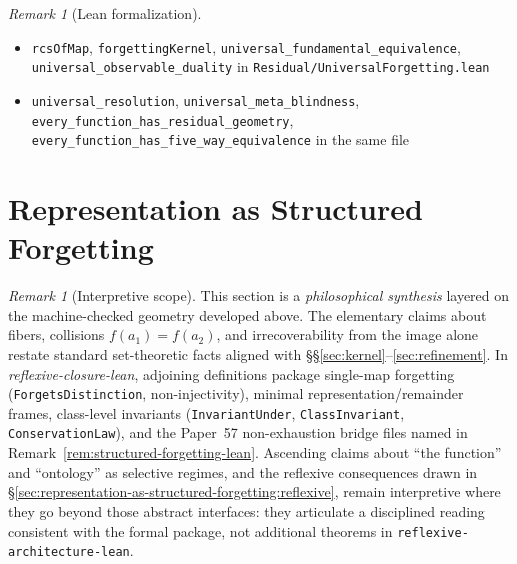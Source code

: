 \documentclass[11pt,a4paper]{article}
\theoremstyle{plain}
\theoremstyle{definition}
\theoremstyle{remark}
\newtheorem{remark}[theorem]{Remark}
\begin{document}
\begin{remark}[Lean formalization]
\leavevmode\par\begin{itemize}[nosep,leftmargin=*,before=\raggedright]
\item \texttt{rcsOfMap}, \texttt{forgettingKernel}, \texttt{universal\_fundamental\_\allowbreak{}equivalence}, \texttt{universal\_observable\_\allowbreak{}duality} in \texttt{Residual/\allowbreak{}UniversalForgetting.lean}
\item \texttt{universal\_resolution}, \texttt{universal\_meta\_blindness}, \texttt{every\_function\_has\_\allowbreak{}residual\_geometry}, \texttt{every\_function\_has\_five\_way\_equivalence} in the same file
\end{itemize}
\end{remark}

\section{Representation as Structured Forgetting}
\label{sec:representation-as-structured-forgetting}

\begin{remark}[Interpretive scope]\label{rem:representation-interpretive}
This section is a \emph{philosophical synthesis} layered on the machine-checked
geometry developed above. The elementary claims about fibers, collisions
$f(a_1)=f(a_2)$, and irrecoverability from the image alone restate standard
set-theoretic facts aligned with \S\S\ref{sec:kernel}--\ref{sec:refinement}.
In \emph{reflexive-closure-lean}, adjoining definitions package single-map
forgetting (\texttt{ForgetsDistinction}, non-injectivity), minimal
representation/remainder frames, class-level invariants
(\texttt{InvariantUnder}, \texttt{ClassInvariant}, \texttt{ConservationLaw}),
and the Paper~57 non-exhaustion bridge files named in Remark~\ref{rem:structured-forgetting-lean}.
Ascending claims about ``the function'' and ``ontology'' as selective regimes,
and the reflexive consequences drawn in \S\ref{sec:representation-as-structured-forgetting:reflexive},
remain interpretive where they go beyond those abstract interfaces: they
articulate a disciplined reading consistent with the formal package, not
additional theorems in \texttt{reflexive-architecture-lean}.
\end{remark}
\end{document}

